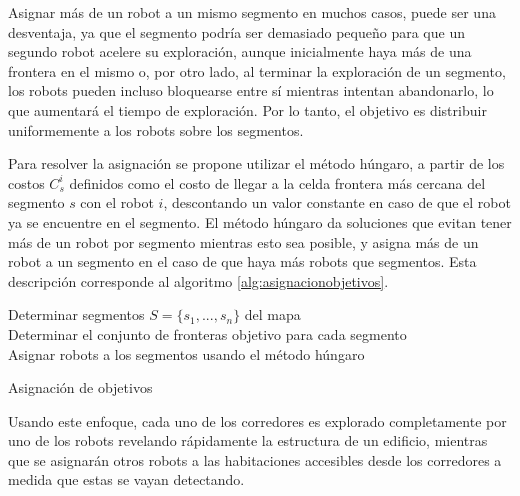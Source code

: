 Asignar más de un robot a un mismo segmento en muchos casos, puede ser una desventaja, ya que el segmento podría ser demasiado pequeño para que un segundo robot acelere su exploración, aunque inicialmente haya más de una frontera en el mismo o, por otro lado, al terminar la exploración de un segmento, los robots pueden incluso bloquearse entre sí mientras intentan abandonarlo, lo que aumentará el tiempo de exploración. Por lo tanto, el objetivo es distribuir uniformemente a los robots sobre los segmentos.

Para resolver la asignación se propone utilizar el método húngaro, a partir de los costos $C_{s}^{i}$ definidos como el costo de llegar a la celda frontera más cercana del segmento $s$ con el robot $i$, descontando un valor constante en caso de que el robot ya se encuentre en el segmento. El método húngaro da soluciones que evitan tener más de un robot por segmento mientras esto sea posible, y asigna más de un robot a un segmento en el caso de que haya más robots que segmentos. Esta descripción corresponde al algoritmo \ref{alg:asignacionobjetivos}.

\begin{algorithm}
\SetAlgoLined
    Determinar segmentos $S = \{s_{1} , ..., s_{n} \}$ del mapa\\
    Determinar el conjunto de fronteras objetivo para cada segmento\\
    Asignar robots a los segmentos usando el método húngaro\\
    \caption{Asignación de objetivos}
    \label{alg:asignacionobjetivos}
    
\end{algorithm}

Usando este enfoque, cada uno de los corredores es explorado completamente por uno de los robots revelando rápidamente la estructura de un edificio, mientras que se asignarán otros robots a las habitaciones accesibles desde los corredores a medida que estas se vayan detectando.




